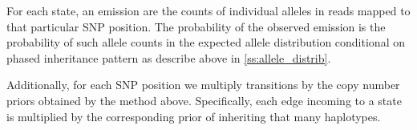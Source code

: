 For each state, an emission are the counts of individual alleles in reads mapped to that particular SNP position. The probability of the observed emission is the probability of such allele counts in the expected allele distribution conditional on phased inheritance pattern as describe above in \ref{ss:allele_distrib}.

Additionally, for each SNP position we multiply transitions by the copy number priors obtained by the method above. Specifically, each edge incoming to a state is multiplied by the corresponding prior of inheriting that many haplotypes. %


\begin{figure}[h]
\centering
{}
\hspace{20pt}
\end{figure}
